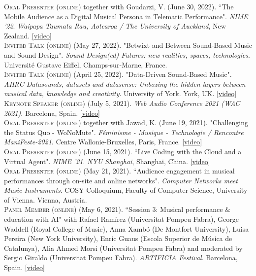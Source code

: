 \documentclass[10pt, a4paper]{article}
\newcommand{\years}[1]{\marginnote{\scriptsize #1}}
\begin{document}
{\years{2022c} \textsc{Oral Presenter (online)} together with Goudarzi, V. (June 30, 2022). “The Mobile Audience as a Digital Musical Persona in Telematic Performance". \emph{NIME '22}. \emph{Waipapa Taumata Rau, Aotearoa / The University of Auckland}, New Zealand. \href{https://youtu.be/xu5ySfbqYs8}{[video]}\\
\years{2022b} \textsc{Invited Talk (online)} (May 27, 2022). "Betwixt and Between Sound-Based Music and Sound Design". \emph{Sound Design(ed) Futures: new realities, spaces, technologies}. Université Gustave Eiffel, Champs-sur-Marne, France.\\ 
\years{2022a} \textsc{Invited Talk (online)} (April 25, 2022). "Data-Driven Sound-Based Music". \emph{AHRC Datasounds, datasets and datasense: Unboxing the hidden layers between musical data, knowledge and creativity}. University of York. York, UK. \href{https://youtu.be/8ootXx1csJQ}{[video]}\\ 
\years{2021h} \textsc{Keynote Speaker (online)} (July 5, 2021). \emph{Web Audio Conference 2021 (WAC 2021)}. Barcelona, Spain. \href{https://youtu.be/7SWu3txbg-w}{[video]}\\ 
\years{2021g} \textsc{Oral Presenter (online)} together with Jawad, K. (June 19, 2021). "Challenging the Status Quo - WoNoMute". \emph{Féminisme - Musique - Technologie / Rencontre ManiFeste-2021}. Centre Wallonie-Bruxelles, Paris, France. \href{https://youtu.be/jXmNvd9ty_o}{[video]}\\
\years{2021f} \textsc{Oral Presenter (online)} (June 15, 2021). “Live Coding with the Cloud and a Virtual Agent". \emph{NIME '21}. 
\emph{NYU Shanghai}, Shanghai, China. \href{https://youtu.be/F4UoH1hRMoU}{[video]}\\
\years{2021e} \textsc{Oral Presenter (online)} (May 21, 2021). “Audience engagement in musical performances through on-site and online networks". \emph{Computer Networks meet Music Instruments}. COSY Colloquium, Faculty of Computer Science, University of Vienna. Vienna, Austria.\\ 
\years{2021d} \textsc{Panel Member (online)} (May 6, 2021). “Session 3: Musical performance \& education with AI" with Rafael Ramírez (Universitat Pompeu Fabra), George Waddell (Royal College of Music), Anna Xambó (De Montfort University), Luisa Pereira (New York University), Enric Guaus (Escola Superior de Música de Catalunya), Alia Ahmed Morsi (Universitat Pompeu Fabra) and moderated by Sergio Giraldo (Universitat Pompeu Fabra). \emph{ARTIFICIA Festival}. Barcelona, Spain. \href{https://youtu.be/o0arHV4s6Mo}{[video]}\\ 
}
\end{document}
